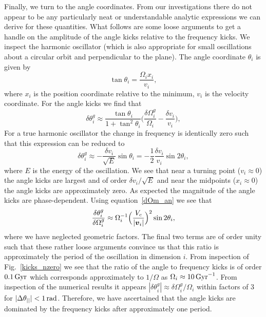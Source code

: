\documentclass[useAMS,usenatbib,fleqn,a4paper]{mn2e}
\def\rad{\,\rm rad}
\def\Gyr{\,{\rm Gyr}}
\newcommand{\bs}[1]{\bmath{#1}}
\begin{document}
Finally, we turn to the angle coordinates. From our investigations there do not appear to be any particularly neat or understandable analytic expressions we can derive for these quantities. What follows are some loose arguments to get a handle on the amplitude of the angle kicks relative to the frequency kicks. We inspect the harmonic oscillator (which is also appropriate for small oscillations about a circular orbit and perpendicular to the plane). The angle coordinate $\theta_i$ is given by
\begin{equation}
\tan\theta_i = \frac{\Omega_i x_i}{v_i},
\end{equation}
where $x_i$ is the position coordinate relative to the minimum, $v_i$ is the velocity coordinate. For the angle kicks we find that
\begin{equation}
\delta\theta^g_i\approx \frac{\tan\theta_i}{1+\tan^2\theta_i}\Big(\frac{\delta\Omega^g_i}{\Omega_i}-\frac{\delta v_i}{v_i}\Big),
\end{equation}
For a true harmonic oscillator the change in frequency is identically zero such that this expression can be reduced to
\begin{equation}
\delta\theta^g_i\approx -\frac{\delta v_i}{\sqrt{E}}\sin\theta_i = -\frac{1}{2}\frac{\delta v_i}{v_i}\sin 2\theta_i,
\end{equation}
where $E$ is the energy of the oscillation. We see that near a turning point ($v_i\approx0$) the angle kicks are largest and of order $\delta v_i/\sqrt{E}$ and near the midpoints ($x_i\approx0$) the angle kicks are approximately zero. As expected the magnitude of the angle kicks are phase-dependent. Using equation~\eqref{dOm_an} we see that
\begin{equation}
\frac{\delta\theta_i^g}{\delta\Omega_i^g}\approx\Omega_i^{-1}\Big(\frac{V_c}{|\bs{v}_i|}\Big)^2\sin 2\theta_i,
\end{equation}
where we have neglected geometric factors. The final two terms are of order unity such that these rather loose arguments convince us that this ratio is approximately the period of the oscillation in dimension $i$. From inspection of Fig.~\ref{kicks_nzero} we see that the ratio of the angle to frequency kicks is of order $0.1\Gyr$ which corresponds approximately to $1/\Omega$ as $\Omega_i\approx10\Gyr^{-1}$. From inspection of the numerical results it appears $|\delta\theta^g_i|\approx\delta\Omega^g_i/\Omega_i$ within factors of $3$ for $|\Delta\theta_{||}|<1\rad$. Therefore, we have ascertained that the angle kicks are dominated by the frequency kicks after approximately one period.
\end{document}
